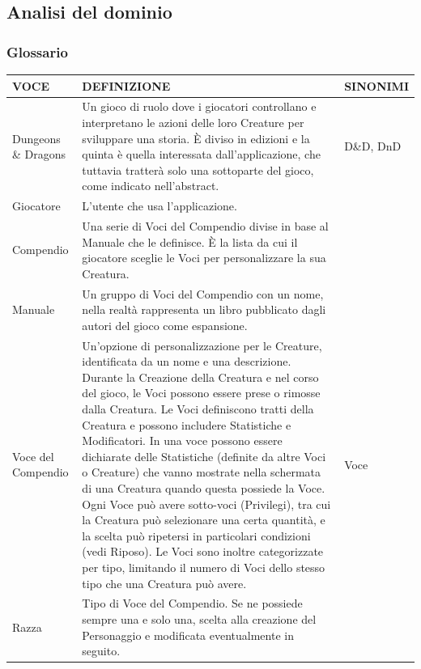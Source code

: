 \documentclass[a4paper, 11pt]{article}
\begin{document}
\newpage
\subsection{Analisi del dominio}
\subsubsection{Glossario}
\begin{center}
\setlength\LTleft{-1cm}
\setlength\LTright{-1cm}
    \begin{longtable}{ |p{3.5cm}|p{9cm}|p{3cm}|  }
        \hline
        \textbf{VOCE} & \textbf{DEFINIZIONE} & \textbf{SINONIMI} \\
        \hline
        Dungeons \& Dragons & Un gioco di ruolo dove i giocatori controllano e interpretano le azioni delle loro Creature per sviluppare una storia. È diviso in edizioni e la quinta è quella interessata dall’applicazione, che tuttavia tratterà solo una sottoparte del gioco, come indicato nell'abstract.  & D\&D, DnD \\
        \hline
        Giocatore & L'utente che usa l'applicazione. & \\\hline
        Compendio & Una serie di Voci del Compendio divise in base al Manuale che le definisce. È la lista da cui il giocatore sceglie le Voci per personalizzare la sua Creatura. & \\\hline
        Manuale & Un gruppo di Voci del Compendio con un nome, nella realtà rappresenta un libro pubblicato dagli autori del gioco come espansione. & \\\hline
        Voce del Compendio & Un’opzione di personalizzazione per le Creature, identificata da un nome e una descrizione. Durante la Creazione della Creatura e nel corso del gioco, le Voci possono essere prese o rimosse dalla Creatura. Le Voci definiscono tratti della Creatura e possono includere Statistiche e Modificatori. In una voce possono essere dichiarate delle Statistiche (definite da altre Voci o Creature) che vanno mostrate nella schermata di una Creatura quando questa possiede la Voce. Ogni Voce può avere sotto-voci (Privilegi), tra cui la Creatura può selezionare una certa quantità, e la scelta può ripetersi in particolari condizioni (vedi Riposo). Le Voci sono inoltre categorizzate per tipo, limitando il numero di Voci dello stesso tipo che una Creatura può avere. & Voce \\\hline
        Razza & Tipo di Voce del Compendio.  Se ne possiede sempre una e solo una, scelta alla creazione del Personaggio e modificata eventualmente in seguito. & \\\hline

\end{longtable}
\end{center}
\end{document}
